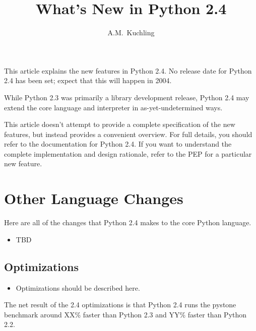 \documentclass{howto}
\title{What's New in Python 2.4}
\author{A.M.\ Kuchling}
\begin{document}
\maketitle
\tableofcontents

This article explains the new features in Python 2.4.  No release date
for Python 2.4 has been set; expect that this will happen in 2004.

While Python 2.3 was primarily a library development release, Python
2.4 may extend the core language and interpreter in
as-yet-undetermined ways.

This article doesn't attempt to provide a complete specification of
the new features, but instead provides a convenient overview.  For
full details, you should refer to the documentation for Python 2.4.
If you want to understand the complete implementation and design
rationale, refer to the PEP for a particular new feature.





\section{Other Language Changes}

Here are all of the changes that Python 2.4 makes to the core Python
language.

\begin{itemize}
\item TBD

\end{itemize}


\subsection{Optimizations}

\begin{itemize}

\item Optimizations should be described here.

\end{itemize}

The net result of the 2.4 optimizations is that Python 2.4 runs the
pystone benchmark around XX\% faster than Python 2.3 and YY\% faster
than Python 2.2.
\end{document}
